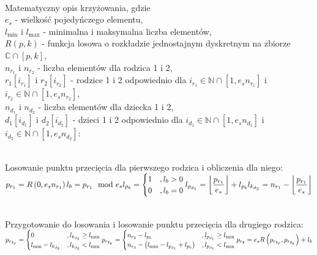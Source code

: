 \noindent\\
Matematyczny opis krzyżowania, gdzie\\
$e_s$ - wielkość pojedyńczego elementu,\\
$l_{\min}$ i $l_{\max}$ - minimalna i maksymalna liczba elementów,\\
$R\left(p, k\right)$ - funkcja losowa o rozkładzie jednostajnym dyskretnym
  na zbiorze $\mathbb{C} \cap \left[p, k\right]$,\\
$n_{r_1}$ i $n_{r_2}$ - liczba elementów dla rodzica 1 i 2,\\
$r_1\left[i_{r_1}\right]$ i $r_2\left[i_{r_2}\right]$ -
  rodzice 1 i 2 odpowiednio dla
  $i_{r_1} \in \mathbb{N} \cap \left[1, e_s n_{r_1}\right]$
  i $i_{r_2} \in \mathbb{N} \cap \left[1, e_s n_{r_2}\right]$,\\
$n_{d_1}$ i $n_{d_2}$ - liczba elementów dla dziecka 1 i 2,\\
$d_1\left[i_{d_1}\right]$ i $d_2\left[i_{d_2}\right]$ -
  dzieci 1 i 2 odpowiednio dla
  $i_{d_1} \in \mathbb{N} \cap \left[1, e_s n_{d_1}\right]$
  i $i_{d_2} \in \mathbb{N} \cap \left[1, e_s n_{d_2}\right]$:

\noindent\\
Losowanie punktu przecięcia dla pierwszego rodzica i obliczenia dla niego:\\
$\displaystyle
  p_{r_1}=R\left(0, e_s n_{r_1}\right)\\
  l_b=p_{r_1} \mod e_s\\
  l_{p_b}=\begin{cases}
    1 &, l_b>0\\
    0 &, l_b=0
  \end{cases}\\
  l_{p_{d_1}}=\left\lfloor
    \frac{p_{r_1}}{e_s}
  \right\rfloor + l_{p_b}\\
  l_{k_{d_2}}=n_{r_1}-\left\lfloor
    \frac{p_{r_1}}{e_s}
  \right\rfloor
$

\noindent\\
Przygotowanie do losowania i losowanie punktu przecięcia dla drugiego rodzica:\\
$\displaystyle
  p_{r_{2_p}}=\begin{cases}
    0
      &, l_{k_{d_2}} \ge l_{\min}\\
    l_{\min}-l_{k_{d_2}}
      &, l_{k_{d_2}}<l_{\min}\\
  \end{cases}\\
  p_{r_{2_k}}=\begin{cases}
    n_{r_2}-l_{p_b}
      &, l_{p_{d_1}} \ge l_{\min}\\
    n_{r_2}-\left(l_{\min}-l_{p_{d_1}}+l_{p_b}\right)
      &, l_{p_{d_1}}<l_{\min}\\
  \end{cases}\\
  p_{r_2}=e_s R\left(p_{r_{2_p}}, p_{r_{2_k}}\right) + l_b
$

